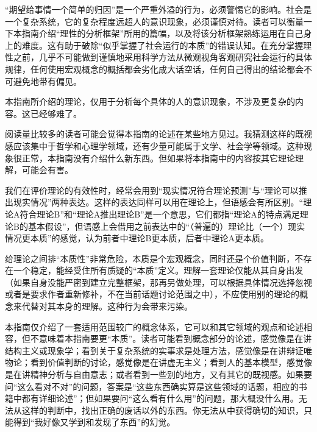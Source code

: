 “期望给事情一个简单的归因”是一个严重外溢的行为，必须警惕它的影响。社会是一个复杂系统，它的复杂程度远超人的意识现象，必须谨慎对待。读者可以衡量一下本指南介绍“理性的分析框架”所用的篇幅，以及将该分析框架熟练运用在自己身上的难度。这有助于破除“似乎掌握了社会运行的本质”的错误认知。在充分掌握理性之前，几乎不可能做到谨慎地采用科学方法从微观视角客观研究社会运行的具体规律，任何使用宏观概念的概括都会劣化成大话空话，任何自己得出的结论都会不可避免地带有偏见。

本指南所介绍的理论，仅用于分析每个具体的人的意识现象，不涉及更复杂的内容。这已经够难了。


阅读量比较多的读者可能会觉得本指南的论述在某些地方见过。我猜测这样的既视感应该集中于哲学和心理学领域，还有少量可能属于文学、社会学等领域。这种现象很正常，本指南没有介绍什么新东西。但如果将本指南中的内容按其它理论理解，可能会有害。

我们在评价理论的有效性时，经常会用到“现实情况符合理论预测”与“理论可以推出现实情况”两种表达。这样的表达同样可以用在理论上，但语感会有所区别。“理论A符合理论B”和“理论A推出理论B”是一个意思，它们都指“理论A的特点满足理论B的基本假设”，但语感上会借用之前表达中的“（普遍的）理论比（一个）现实情况更本质”的感觉，认为前者中理论B更本质，后者中理论A更本质。

给理论之间排“本质性”非常危险，本质是个宏观概念，同时还是个价值判断，不存在一个稳定，能经受住所有质疑的“本质”定义。理解一套理论仅能从其自身出发（如果自身没能严密到建立完整框架，那再另做处理，可以根据具体情况选择忽视或者是要求作者重新修补，不在当前话题讨论范围之中），不应使用别的理论的概念来代替对其本身的理解。这种行为会带来污染。

本指南仅介绍了一套适用范围较广的概念体系，它可以和其它领域的观点和论述相容，但不意味着本指南要更“本质”。读者可能看到概念部分的论述，感觉像是在讲结构主义或现象学；看到关于复杂系统的实事求是处理方法，感觉像是在讲辩证唯物论；看到价值判断的讨论，感觉像是在讲虚无主义；看到人的基本模型，感觉像是在讲精神分析与自由意志；或者看到一些别的地方，又有其它的既视感。如果要问“这么看对不对”的问题，答案是“这些东西确实算是这些领域的话题，相应的书籍中都有详细论述”；但如果要问“这么看有什么用”的问题，那大概没什么用。无法从这样的判断中，找出正确的废话以外的东西。你无法从中获得确切的知识，只能得到“我好像又学到和发现了东西”的幻觉。


